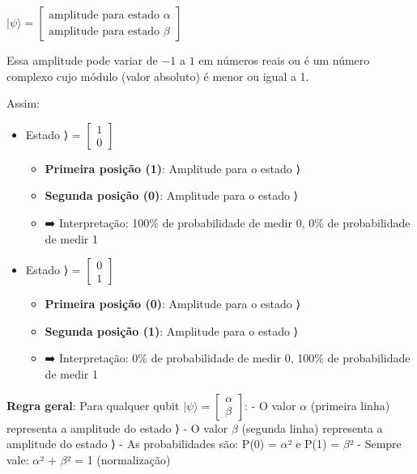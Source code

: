 \documentclass[
  brazilian,
]{report}
\providecommand{\tightlist}{%
  \setlength{\itemsep}{0pt}\setlength{\parskip}{0pt}}
\begin{document}
\(|\psi⟩ = \begin{bmatrix} \text{amplitude para estado } \alpha  \\ \text{amplitude para estado } \beta \end{bmatrix}\)

Essa amplitude pode variar de \(-1\) a \(1\) em números reais ou é um
número complexo cujo módulo (valor absoluto) é menor ou igual a 1.

Assim:

\begin{itemize}
\tightlist
\item
  Estado ⟩ = \(\begin{bmatrix} 1 \\ 0 \end{bmatrix}\)

  \begin{itemize}
  \tightlist
  \item
    \textbf{Primeira posição (1)}: Amplitude para o estado ⟩
  \item
    \textbf{Segunda posição (0)}: Amplitude para o estado ⟩
  \item
    ➡️ Interpretação: 100\% de probabilidade de medir 0, 0\% de
    probabilidade de medir 1
  \end{itemize}
\item
  Estado ⟩ = \(\begin{bmatrix} 0 \\ 1 \end{bmatrix}\)

  \begin{itemize}
  \tightlist
  \item
    \textbf{Primeira posição (0)}: Amplitude para o estado ⟩
  \item
    \textbf{Segunda posição (1)}: Amplitude para o estado ⟩
  \item
    ➡️ Interpretação: 0\% de probabilidade de medir 0, 100\% de
    probabilidade de medir 1
  \end{itemize}
\end{itemize}

\textbf{Regra geral}: Para qualquer qubit
\(|\psi⟩ = \begin{bmatrix} \alpha \\ \beta \end{bmatrix}\): - O valor
\textbf{\(\alpha\)} (primeira linha) representa a amplitude do estado
⟩ - O valor \textbf{\(\beta\)} (segunda linha) representa a
amplitude do estado ⟩ - As probabilidades são: P(0) =
\textbar{}\(\alpha\)\textbar² e P(1) = \textbar{}\(\beta\)\textbar² -
Sempre vale: \textbar{}\(\alpha\)\textbar² +
\textbar{}\(\beta\)\textbar² = 1 (normalização)
\end{document}
